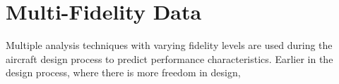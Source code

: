 \section{Multi-Fidelity Data}

Multiple analysis techniques with varying fidelity levels are used during the aircraft design process to predict performance characteristics. Earlier in the design process, where there is more freedom in design, 